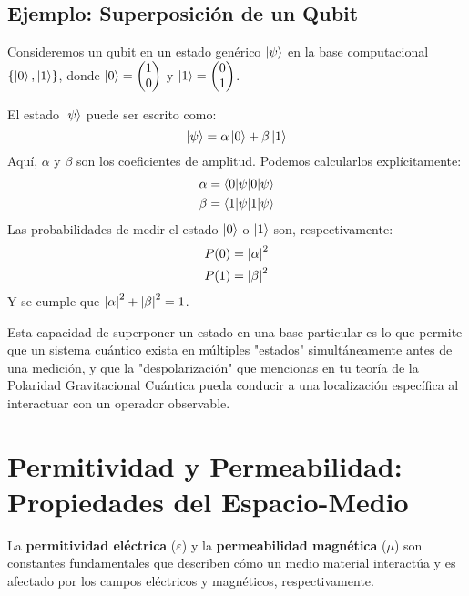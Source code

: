 \documentclass{book}
\begin{document}
\subsection*{Ejemplo: Superposición de un Qubit}
Consideremos un qubit en un estado genérico $\ket{\psi}$ en la base computacional $\{\ket{0}, \ket{1}\}$, donde $\ket{0} = \begin{pmatrix} 1 \\ 0 \end{pmatrix}$ y $\ket{1} = \begin{pmatrix} 0 \\ 1 \end{pmatrix}$.

El estado $\ket{\psi}$ puede ser escrito como:
\begin{equation}
    \ket{\psi} = \alpha \ket{0} + \beta \ket{1}
    \label{eq:qubit_superposicion}
\end{equation}
Aquí, $\alpha$ y $\beta$ son los coeficientes de amplitud. Podemos calcularlos explícitamente:
\begin{align}
    \alpha &= \braket{0 | \psi} \\
    \beta &= \braket{1 | \psi}
\end{align}
Las probabilidades de medir el estado $\ket{0}$ o $\ket{1}$ son, respectivamente:
\begin{align}
    P(0) &= \abs{\alpha}^2 \\
    P(1) &= \abs{\beta}^2
\end{align}
Y se cumple que $\abs{\alpha}^2 + \abs{\beta}^2 = 1$.

Esta capacidad de superponer un estado en una base particular es lo que permite que un sistema cuántico exista en múltiples "estados" simultáneamente antes de una medición, y que la "despolarización" que mencionas en tu teoría de la Polaridad Gravitacional Cuántica pueda conducir a una localización específica al interactuar con un operador observable.

\section*{Permitividad y Permeabilidad: Propiedades del Espacio-Medio}
\label{sec:permitividad_permeabilidad}

La \textbf{permitividad eléctrica} ($\varepsilon$) y la \textbf{permeabilidad magnética} ($\mu$) son constantes fundamentales que describen cómo un medio material interactúa y es afectado por los campos eléctricos y magnéticos, respectivamente.
\end{document}
